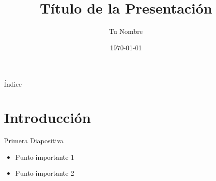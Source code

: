\documentclass{beamer}
\title{Título de la Presentación}
\author{Tu Nombre}
\date{\today}
\begin{document}
\frame{\titlepage}

\begin{frame}{Índice}
    \tableofcontents
\end{frame}

\section{Introducción}
\begin{frame}{Primera Diapositiva}
    \begin{itemize}
        \item Punto importante 1
        \item Punto importante 2
    \end{itemize}
\end{frame}
\end{document}
